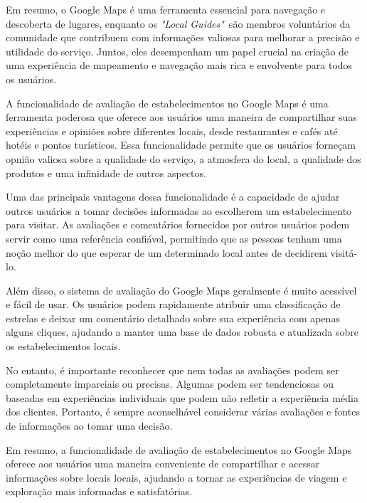 Em resumo, o Google Maps é uma ferramenta essencial para navegação e descoberta de lugares, enquanto os \emph{"Local Guides"}~são membros voluntários da comunidade que contribuem com informações valiosas para melhorar a precisão e utilidade do serviço. Juntos, eles desempenham um papel crucial na criação de uma experiência de mapeamento e navegação mais rica e envolvente para todos os usuários.



A funcionalidade de avaliação de estabelecimentos no Google Maps é uma ferramenta poderosa que oferece aos usuários uma maneira de compartilhar suas experiências e opiniões sobre diferentes locais, desde restaurantes e cafés até hotéis e pontos turísticos. Essa funcionalidade permite que os usuários forneçam opnião valiosa sobre a qualidade do serviço, a atmosfera do local, a qualidade dos produtos e uma infinidade de outros aspectos.

Uma das principais vantagens dessa funcionalidade é a capacidade de ajudar outros usuários a tomar decisões informadas ao escolherem um estabelecimento para visitar. As avaliações e comentários fornecidos por outros usuários podem servir como uma referência confiável, permitindo que as pessoas tenham uma noção melhor do que esperar de um determinado local antes de decidirem visitá-lo.

Além disso, o sistema de avaliação do Google Maps geralmente é muito acessível e fácil de usar. Os usuários podem rapidamente atribuir uma classificação de estrelas e deixar um comentário detalhado sobre sua experiência com apenas alguns cliques, ajudando a manter uma base de dados robusta e atualizada sobre os estabelecimentos locais.

No entanto, é importante reconhecer que nem todas as avaliações podem ser completamente imparciais ou precisas. Algumas podem ser tendenciosas ou baseadas em experiências individuais que podem não refletir a experiência média dos clientes. Portanto, é sempre aconselhável considerar várias avaliações e fontes de informações ao tomar uma decisão.

Em resumo, a funcionalidade de avaliação de estabelecimentos no Google Maps oferece aos usuários uma maneira conveniente de compartilhar e acessar informações sobre locais locais, ajudando a tornar as experiências de viagem e exploração mais informadas e satisfatórias.

